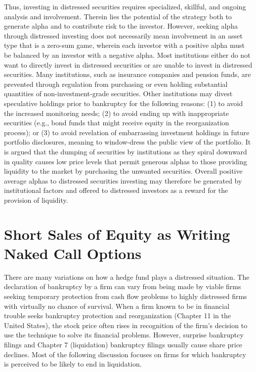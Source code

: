 \documentclass[11pt]{article}
\begin{document}
Thus, investing in distressed securities requires specialized, skillful, and ongoing analysis and involvement. Therein lies the potential of the strategy both to generate alpha and to contribute risk to the investor. However, seeking alpha through distressed investing does not necessarily mean involvement in an asset type that is a zero-sum game, wherein each investor with a positive alpha must be balanced by an investor with a negative alpha. Most institutions either do not want to directly invest in distressed securities or are unable to invest in distressed securities. Many institutions, such as insurance companies and pension funds, are prevented through regulation from purchasing or even holding substantial quantities of non-investment-grade securities. Other institutions may divest speculative holdings prior to bankruptcy for the following reasons: (1) to avoid the increased monitoring needs; (2) to avoid ending up with inappropriate securities (e.g., bond funds that might receive equity in the reorganization process); or (3) to avoid revelation of embarrassing investment holdings in future portfolio disclosures, meaning to window-dress the public view of the portfolio. It is argued that the dumping of securities by institutions as they spiral downward in quality causes low price levels that permit generous alphas to those providing liquidity to the market by purchasing the unwanted securities. Overall positive average alphas to distressed securities investing may therefore be generated by institutional factors and offered to distressed investors as a reward for the provision of liquidity.

\section*{Short Sales of Equity as Writing Naked Call Options}
There are many variations on how a hedge fund plays a distressed situation. The declaration of bankruptcy by a firm can vary from being made by viable firms seeking temporary protection from cash flow problems to highly distressed firms with virtually no chance of survival. When a firm known to be in financial trouble seeks bankruptcy protection and reorganization (Chapter 11 in the United States), the stock price often rises in recognition of the firm's decision to use the technique to solve its financial problems. However, surprise bankruptcy filings and Chapter 7 (liquidation) bankruptcy filings usually cause share price declines. Most of the following discussion focuses on firms for which bankruptcy is perceived to be likely to end in liquidation.
\end{document}
